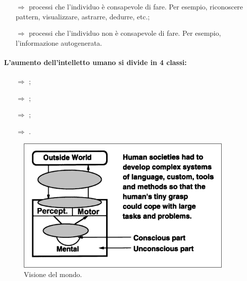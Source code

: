 \begin{itemize}
    \item [$\Rightarrow$]  processi che l'individuo è consapevole di fare. Per 
    esempio, riconoscere pattern, visualizzare, astrarre, dedurre, etc.;
    \item [$\Rightarrow$]  processi che l'individuo non è consapevole di fare. Per esempio,
    l'informazione autogenerata.
\end{itemize}

\paragraph{L'aumento dell'intelletto umano si divide in 4 classi:}

\begin{itemize}
    \item [$\Rightarrow$] ;
    \item [$\Rightarrow$] ;
    \item [$\Rightarrow$] ;
    \item [$\Rightarrow$] .
\end{itemize}


\begin{figure}[h]
    \centering
    \includegraphics[scale=0.5]{images/Mondo.png}
    \caption{Visione del mondo.}
    \label{fig:Engelbart}
\end{figure}

\subsubsection{}

